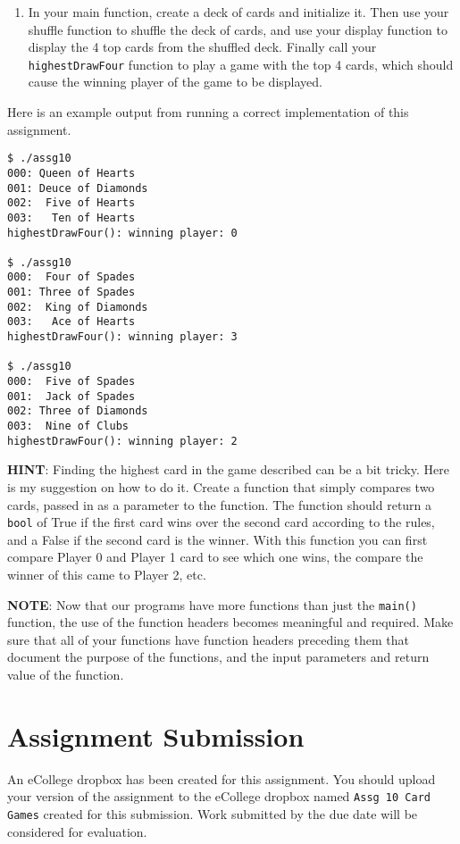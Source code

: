 \documentclass[11pt]{article}
\begin{document}
\begin{enumerate}
\item In your main function, create a deck of cards and initialize it.
Then use your shuffle function to shuffle the deck of cards, and
use your display function to display the 4 top cards from the
shuffled deck.  Finally call your \verb~highestDrawFour~ function
to play a game with the top 4 cards, which should cause
the winning player of the game to be displayed.
\end{enumerate}

Here is an example output from running a correct implementation of
this assignment.

\begin{verbatim}
$ ./assg10 
000: Queen of Hearts
001: Deuce of Diamonds
002:  Five of Hearts
003:   Ten of Hearts
highestDrawFour(): winning player: 0

$ ./assg10 
000:  Four of Spades
001: Three of Spades
002:  King of Diamonds
003:   Ace of Hearts
highestDrawFour(): winning player: 3

$ ./assg10 
000:  Five of Spades
001:  Jack of Spades
002: Three of Diamonds
003:  Nine of Clubs
highestDrawFour(): winning player: 2
\end{verbatim}

\textbf{HINT}: Finding the highest card in the game described can be a bit
tricky.  Here is my suggestion on how to do it.  Create a function
that simply compares two cards, passed in as a parameter to the
function.  The function should return a \verb~bool~ of True if the first card
wins over the second card according to the rules, and a False if the
second card is the winner.  With this function you can first compare
Player 0 and Player 1 card to see which one wins, the compare the
winner of this came to Player 2, etc.

\textbf{NOTE}: Now that our programs have more functions than just the
\verb~main()~ function, the use of the function headers becomes meaningful
and required.  Make sure that all of your functions have function
headers preceding them that document the purpose of the functions, and
the input parameters and return value of the function.
\section*{Assignment Submission}
\label{sec-4}

An eCollege dropbox has been created for this assignment.  You should
upload your version of the assignment to the eCollege dropbox named
\verb~Assg 10 Card Games~ created for this submission.  Work
submitted by the due date will be considered for evaluation.
\end{document}
